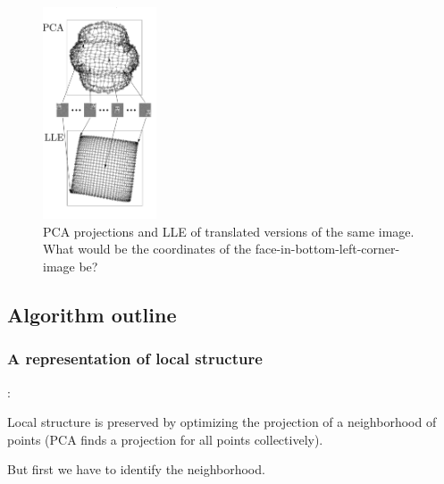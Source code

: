 \begin{frame}
 
\begin{figure}[ht]
	\centering
    \includegraphics[width=0.3\textwidth]{img/fig3_lle_intro_cropped.png}
	\caption{PCA projections and LLE of translated versions of the same image. What would be the coordinates of the face-in-bottom-left-corner-image be?}
	\label{fig:faces_translated_pca_lle}
\end{figure}
\end{frame}

\subsection{Algorithm outline}

\subsubsection{A representation of local structure}

\begin{frame}{\subsecname:~\subsubsecname}

Local structure is preserved by optimizing the projection of a neighborhood of points (PCA finds a projection for all points collectively).

\pause

But first we have to identify the neighborhood.

\end{frame}

